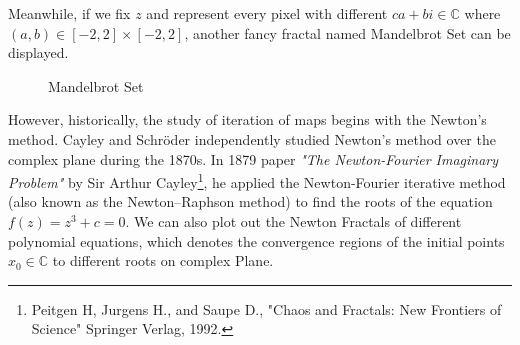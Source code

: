 \documentclass[11pt]{article}
\begin{document}
Meanwhile, if we fix $z$ and represent every pixel with different $ca+bi\in\mathbb{C}$ where $(a,b)\in[-2,2]\times[-2,2]$, another fancy fractal named Mandelbrot Set can be displayed.
\begin{figure}[H]
	\centering
	\centering
\caption{Mandelbrot Set}
\end{figure}

However, historically, the study of iteration of maps begins with the Newton's method. Cayley and Schröder independently studied Newton's method over the complex plane during the 1870s. In 1879 paper \textit{"The Newton-Fourier Imaginary Problem"} by Sir Arthur Cayley\footnote{Peitgen H, Jurgens H., and Saupe D., "Chaos and Fractals: New Frontiers of Science" Springer Verlag, 1992.}, he applied the Newton-Fourier iterative method (also known as the Newton–Raphson method) to find the roots of the equation $f(z)=z^3+c=0$. We can also plot out the Newton Fractals of different polynomial equations, which denotes the convergence regions of the initial points $x_0\in\mathbb{C}$ to different roots on complex Plane.
\end{document}
